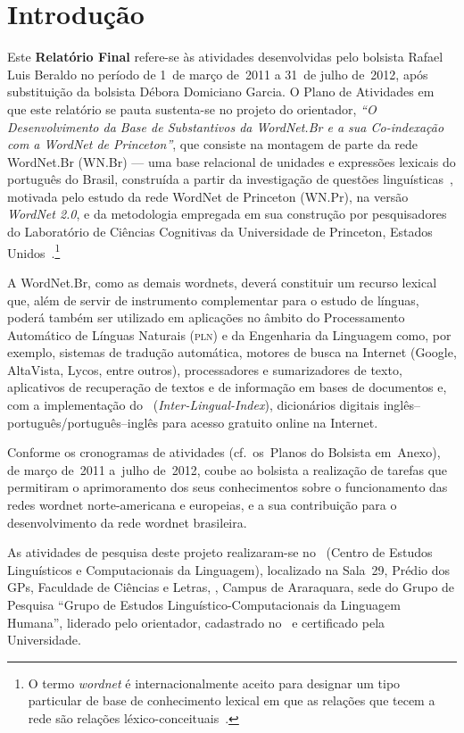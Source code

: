 \chapter{Introdução}

Este \textbf{Relatório Final} refere-se às atividades desenvolvidas pelo
bolsista Rafael Luis Beraldo no período de 1\textordmasculine~de março de~2011
a 31~de julho de~2012, após substituição da bolsista Débora Domiciano Garcia. O
Plano de Atividades em que este relatório se pauta sustenta-se no projeto do
orientador, \textit{``O Desenvolvimento da Base de Substantivos da WordNet.Br e
a sua Co-indexação com a WordNet de Princeton''}, que consiste na montagem de
parte da rede WordNet.Br (WN.Br) --- uma base relacional de unidades e
expressões lexicais do português do Brasil, construída a partir da investigação
de questões linguísticas~\cite{bentoetal,bento}, motivada pelo estudo da rede
WordNet de Princeton (WN.Pr), na versão \textit{WordNet 2.0}, e da metodologia
empregada em sua construção por pesquisadores do Laboratório de Ciências
Cognitivas da Universidade de Princeton, Estados
Unidos~\cite{miller,fellbaum}.\footnote{O termo \textit{wordnet} é
internacionalmente aceito para designar um tipo particular de base de
conhecimento lexical em que as relações que tecem a rede são relações
léxico-conceituais~\cite{marrafa}.} 

A WordNet.Br, como as demais wordnets, deverá constituir um recurso lexical
que, além de servir de instrumento complementar para o estudo de línguas,
poderá também ser utilizado em aplicações no âmbito do Processamento Automático
de Línguas Naturais (\textsc{pln}) e da Engenharia da Linguagem como, por
exemplo, sistemas de tradução automática, motores de busca na Internet (Google,
AltaVista, Lycos, entre outros), processadores e sumarizadores de texto,
aplicativos de recuperação de textos e de informação em bases de documentos e,
com a implementação do
\ili~(\foreignlanguage{english}{\textit{Inter-Lingual-Index}}), dicionários
digitais inglês--português/português--inglês para acesso gratuito online na
Internet.

Conforme os cronogramas de atividades (cf.~os~Planos do Bolsista em~Anexo), de
março de~2011 a~julho de~2012, coube ao bolsista a realização de tarefas que
permitiram o aprimoramento dos seus conhecimentos sobre o funcionamento das
redes wordnet norte-americana e europeias, e a sua contribuição para o
desenvolvimento da rede wordnet brasileira.

As atividades de pesquisa deste projeto realizaram-se no \celic\ (Centro de
Estudos Linguísticos e Computacionais da Linguagem), localizado na Sala~29,
Prédio dos GPs, Faculdade de Ciências e Letras, \unesp, Campus de Araraquara,
sede do Grupo de Pesquisa ``Grupo de Estudos Linguístico-Computacionais da
Linguagem Humana'', liderado pelo orientador, cadastrado no \cnpq\ e
certificado pela Universidade.
